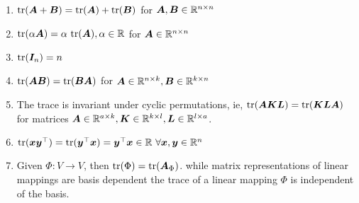 \begin{enumerate}
    \item $\text{tr}(\bm{A} + \bm{B}) = \text{tr}(\bm{A}) + \text{tr}(\bm{B})$ for $\bm{A}, \bm{B} \in \mathbb{R}^{n\times n}$
    \hfill \cite{mfml/book/mml/Deisenroth-Faisal-Ong}

    \item $\tr(\alpha \bm{A}) = \alpha\ \tr(\bm{A}), \alpha \in \mbbR$ for $\bm{A} \in \mathbb{R}^{n\times n}$
    \hfill \cite{mfml/book/mml/Deisenroth-Faisal-Ong}
    
    \item $\text{tr}(\bm{I}_n) = n$
    \hfill \cite{mfml/book/mml/Deisenroth-Faisal-Ong}
    
    \item $\text{tr}(\bm{AB}) = \text{tr}(\bm{BA})$ for $\bm{A} \in \mathbb{R}^{n\times k}, \bm{B} \in \mathbb{R}^{k\times n}$
    \hfill \cite{mfml/book/mml/Deisenroth-Faisal-Ong}

    \item The trace is invariant under cyclic permutations, ie, $\text{tr}(\bm{AKL}) = \text{tr}(\bm{KLA})$ for matrices $\bm{A} \in  \mathbb{R}^{a \times k}, \bm{K} \in  \mathbb{R}^{k \times l}, \bm{L} \in  \mathbb{R}^{l \times a}$. 
    \hfill \cite{mfml/book/mml/Deisenroth-Faisal-Ong}

    \item $
        \tr(\bm{xy}^\top) = \tr(\bm{y} ^\top \bm{x}) = \bm{y} ^\top \bm{x} \in \mbbR\ 
        \forall \bm{x}, \bm{y} \in \mbbR^n
    $
    \hfill \cite{mfml/book/mml/Deisenroth-Faisal-Ong}

    \item Given $\Phi : V \to V$, then $\text{tr}(\Phi) = \text{tr}(\bm{A}_\Phi)$. while matrix representations of linear mappings are basis dependent the trace of a linear mapping $\Phi$ is independent of the basis.
    \hfill \cite{mfml/book/mml/Deisenroth-Faisal-Ong}
\end{enumerate}







